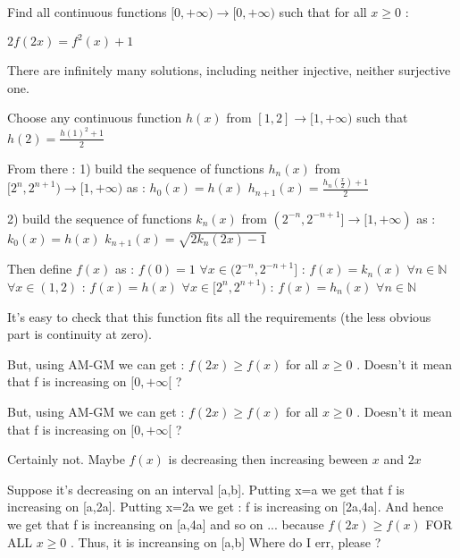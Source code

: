 \begin{solution}
	\begin{tcolorbox}Find all continuous functions $ [ 0, +\infty ) \to [ 0, +\infty ) $ such that for all $x\ge 0$ :

$2f(2x)= f^2(x)+1$
\end{tcolorbox}
There are infinitely many solutions, including neither injective, neither surjective one.

Choose any continuous function $h(x)$ from $[1,2]\to[1,+\infty)$ such that $h(2)=\frac{h(1)^2+1}2$

From there :
1) build the sequence of functions $h_n(x)$ from $[2^n,2^{n+1})\to[1,+\infty)$ as :
$h_0(x)=h(x)$
$h_{n+1}(x)=\frac{h_n(\frac x2)+1}2$

2) build the sequence of functions $k_n(x)$ from $(2^{-n},2^{-n+1}]\to[1,+\infty)$ as :
$k_0(x)=h(x)$
$k_{n+1}(x)=\sqrt{2k_n(2x)-1}$

Then define $f(x)$ as :
$f(0)=1$
$\forall x\in(2^{-n},2^{-n+1}]$ : $f(x)=k_n(x)$ $\forall n\in\mathbb N$
$\forall x\in(1,2)$ : $f(x)=h(x)$
$\forall x\in[2^n,2^{n+1})$ : $f(x)=h_n(x)$ $\forall n\in\mathbb N$

It's easy to check that this function fits all the requirements (the less obvious part is continuity at zero).
\end{solution}



\begin{solution}
	But, using AM-GM we can get : $ f(2x) \ge f(x) $ for all $ x\ge 0 $ . Doesn't it mean that f is increasing on $[0,+\infty[$ ?
\end{solution}



\begin{solution}
	\begin{tcolorbox}But, using AM-GM we can get : $ f(2x) \ge f(x) $ for all $ x\ge 0 $ . Doesn't it mean that f is increasing on $[0,+\infty[$ ?\end{tcolorbox}
Certainly not. Maybe $f(x)$ is decreasing then increasing beween $x$ and $2x$
\end{solution}



\begin{solution}
	Suppose it's decreasing on an interval [a,b]. Putting x=a we get that f is increasing on [a,2a]. Putting x=2a we get : f is increasing on [2a,4a]. 
And hence we get that f is increansing on [a,4a] and so on ... because $ f(2x) \ge f(x) $ FOR ALL $ x\ge0$ . Thus, it is increansing on [a,b]
Where do I err, please ?
\end{solution}



